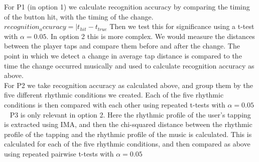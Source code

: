 For P1 (in option 1) we calculate recognition accuracy by comparing the timing of the button hit, with the timing of the change. $recognition_accuracy = |t_{hit}-t_{true}$ Then we test this for significance using a t-test with $\alpha=0.05$. In option 2 this is more complex. We would measure the distances between the player taps and compare them before and after the change. The point in which we detect a change in average tap distance is compared to the time the change occurred musically and used to calculate recognition accuracy as above.\\
For P2 we take recognition accuracy as calculated above, and group them by the five different rhythmic conditions we created. Each of the five rhythmic conditions is then compared with each other using repeated t-tests with $\alpha=0.05$\\  
P3 is only relevant in option 2. Here the rhythmic profile of the user's tapping is extracted using IMA, and then the chi-squared distance between the rhythmic profile of the tapping and the rhythmic profile of the music is calculated. This is calculated for each of the five rhythmic conditions, and then compared as above using repeated pairwise t-tests with $\alpha=0.05$

